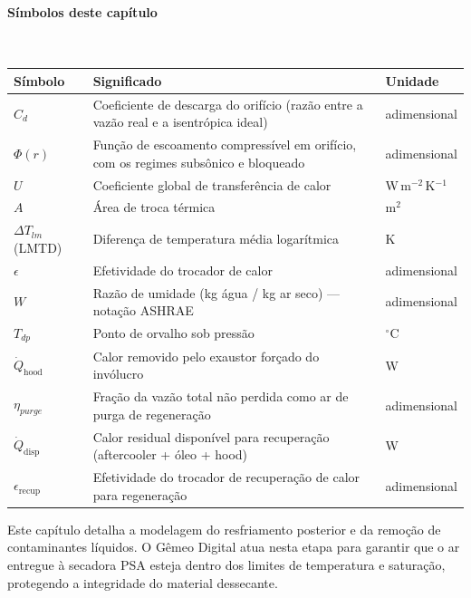 \documentclass[12pt,a4paper]{article}
\numberwithin{equation}{section}
\numberwithin{table}{section}
\numberwithin{figure}{section}
\begin{document}
{\paragraph{Símbolos deste capítulo}\mbox{}\\[-0.5em]
{\small
\begin{longtable}{>{\raggedright\arraybackslash}p{2.6cm} >{\raggedright\arraybackslash}p{9.2cm} >{\raggedright\arraybackslash}p{2.6cm}}
	\toprule
	\textbf{Símbolo} & \textbf{Significado} & \textbf{Unidade} \\ \midrule
	\endhead
	$C_d$ & Coeficiente de descarga do orifício (razão entre a vazão real e a isentrópica ideal) & adimensional \\
	$\Phi(r)$ & Função de escoamento compressível em orifício, com os regimes subsônico e bloqueado & adimensional \\
	$U$ & Coeficiente global de transferência de calor & W\,m$^{-2}$\,K$^{-1}$ \\
	$A$ & Área de troca térmica & m$^2$ \\
	$\Delta T_{lm}$ (LMTD) & Diferença de temperatura média logarítmica & K \\
	$\epsilon$ & Efetividade do trocador de calor & adimensional \\
	$W$\dag & Razão de umidade (kg água / kg ar seco) — notação ASHRAE & adimensional \\
	$T_{dp}$ & Ponto de orvalho sob pressão & $^{\circ}$C \\
	$\dot{Q}_{\text{hood}}$ & Calor removido pelo exaustor forçado do invólucro & W \\
	$\eta_{purge}$ & Fração da vazão total não perdida como ar de purga de regeneração & adimensional \\
	$\dot{Q}_{\text{disp}}$ & Calor residual disponível para recuperação (aftercooler + óleo + hood) & W \\
	$\epsilon_{\text{recup}}$ & Efetividade do trocador de recuperação de calor para regeneração & adimensional \\
	\bottomrule
\end{longtable}
}





	
	Este capítulo detalha a modelagem do resfriamento posterior e da remoção de contaminantes líquidos. O Gêmeo Digital atua nesta etapa para garantir que o ar entregue à secadora PSA esteja dentro dos limites de temperatura e saturação, protegendo a integridade do material dessecante.
	
}
\end{document}
